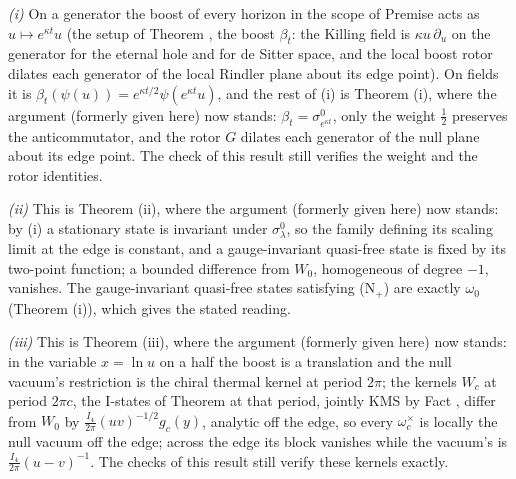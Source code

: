 \emph{(i)} On a generator the boost of every horizon in the scope of Premise  acts as $u \mapsto e^{\kappa t}u$ (the setup of Theorem , the boost $\beta_{t}$: the Killing field is $\kappa u\,\partial_{u}$ on the generator for the eternal hole and for de Sitter space, and the local boost rotor dilates each generator of the local Rindler plane about its edge point). On fields it is $\beta_{t}(\psi(u)) = e^{\kappa t/2}\psi(e^{\kappa t}u)$, and the rest of (i) is Theorem (i), where the argument (formerly given here) now stands: $\beta_{t} = \sigma^{0}_{e^{\kappa t}}$, only the weight $\tfrac12$ preserves the anticommutator, and the rotor $G$ dilates each generator of the null plane about its edge point. The check of this result still verifies the weight and the rotor identities.

\emph{(ii)} This is Theorem (ii), where the argument (formerly given here) now stands: by (i) a stationary state is invariant under $\sigma^{0}_{\lambda}$, so the family defining its scaling limit at the edge is constant, and a gauge-invariant quasi-free state is fixed by its two-point function; a bounded difference from $W_{0}$, homogeneous of degree $-1$, vanishes. The gauge-invariant quasi-free states satisfying (N$_{+}$) are exactly $\omega_{0}$ (Theorem (i)), which gives the stated reading.

\emph{(iii)} This is Theorem (iii), where the argument (formerly given here) now stands: in the variable $x = \ln u$ on a half the boost is a translation and the null vacuum's restriction is the chiral thermal kernel at period $2\pi$; the kernels $W_{c}$ at period $2\pi c$, the I-states of Theorem  at that period, jointly KMS by Fact , differ from $W_{0}$ by $\tfrac{I_{4}}{2\pi}(uv)^{-1/2}g_{c}(y)$, analytic off the edge, so every $\omega_{c}^{\times}$ is locally the null vacuum off the edge; across the edge its block vanishes while the vacuum's is $\tfrac{I_{4}}{2\pi}(u - v)^{-1}$. The checks of this result still verify these kernels exactly.

